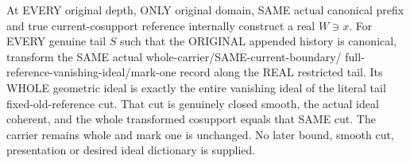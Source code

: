 \begin{theorem}
\label{hir:original-canonical-tail-whole-fixed-reference-ideal-comparison}
\leanok
{}
At EVERY original depth, ONLY original domain, SAME actual canonical prefix
and true current-cosupport reference internally construct a real $W\ni x$.
For EVERY genuine tail $S$ such that the ORIGINAL appended history is
canonical, transform the SAME actual whole-carrier/SAME-current-boundary/
full-reference-vanishing-ideal/mark-one record along the REAL restricted tail.
Its WHOLE geometric ideal is exactly the entire vanishing ideal of the
literal tail fixed-old-reference cut. That cut is genuinely closed smooth,
the actual ideal coherent, and the whole transformed cosupport equals that
SAME cut. The carrier remains whole and mark one is unchanged. No later
bound, smooth cut, presentation or desired ideal dictionary is supplied.
\end{theorem}
